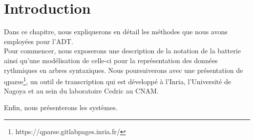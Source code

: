 \section*{Introduction}
Dans ce chapitre, nous expliquerons en détail les méthodes que nous avons
employées pour l’ADT.\\
Pour commencer, nous exposerons une description de la notation de la batterie
ainsi qu’une modélisation de celle-ci pour la représentation des données
rythmiques en arbres syntaxiques. Nous poursuiverons avec une présentation de
qparse\footnote{https://qparse.gitlabpages.inria.fr/}, un outil de
transcription qui est développé à l'Inria, l'Université de Nagoya et 
au sein du laboratoire Cedric au CNAM.

Enfin, nous présenterons les systèmes. 

